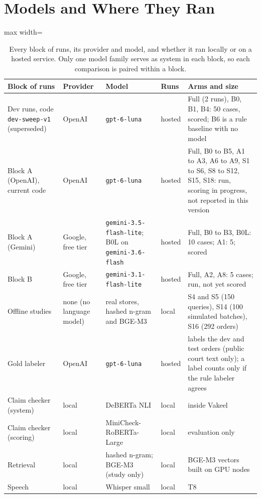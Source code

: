 \section{Models and Where They Ran}
\label{app:models}

\begin{table}[H]
\centering\small
\begin{adjustbox}{max width=\textwidth}
\begin{tabular}{@{}p{4.0cm}p{2.6cm}p{4.2cm}p{1.6cm}p{5.2cm}@{}}
\toprule
Block of runs & Provider & Model & Runs & Arms and size \\
\midrule
Dev runs, code \texttt{dev-sweep-v1} (superseded) & OpenAI & \texttt{gpt-6-luna} & hosted & Full (2 runs), B0, B1, B4: 50 cases, scored; B6 is a rule baseline with no model \\
Block A (OpenAI), current code & OpenAI & \texttt{gpt-6-luna} & hosted & Full, B0 to B5, A1 to A3, A6 to A9, S1 to S6, S8 to S12, S15, S18: run, scoring in progress, not reported in this version \\
Block A (Gemini) & Google, free tier & \texttt{gemini-3.5-flash-lite}; B0L on \texttt{gemini-3.6-flash} & hosted & Full, B0 to B3, B0L: 10 cases; A1: 5; scored \\
Block B & Google, free tier & \texttt{gemini-3.1-flash-lite} & hosted & Full, A2, A8: 5 cases; run, not yet scored \\
Offline studies & none (no language model) & real stores, hashed n-gram and BGE-M3 & local & S4 and S5 (150 queries), S14 (100 simulated batches), S16 (292 orders) \\
Gold labeler & OpenAI & \texttt{gpt-6-luna} & hosted & labels the dev and test orders (public court text only); a label counts only if the rule labeler agrees \\
Claim checker (system) & local & DeBERTa NLI & local & inside Vakeel \\
Claim checker (scoring) & local & MiniCheck-RoBERTa-Large & local & evaluation only \\
Retrieval & local & hashed n-gram; BGE-M3 (study only) & local & BGE-M3 vectors built on GPU nodes \\
Speech & local & Whisper small & local & T8 \\
\bottomrule
\end{tabular}
\end{adjustbox}
\caption{Every block of runs, its provider and model, and whether it ran locally or on a hosted service. Only one model family serves as system in each block, so each comparison is paired within a block.}
\label{tab:models}
\end{table}

